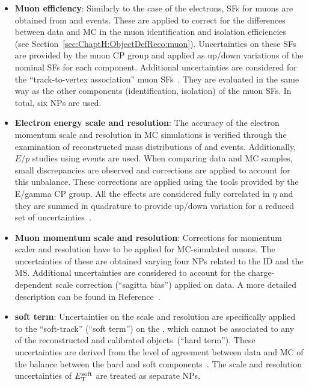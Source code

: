 \begin{itemize}
	\item \textbf{Muon efficiency}: Similarly to the case of the electrons, SFs for muons are obtained from \Zmpmm 
	and \Jmm events. These are applied to correct for the differences between data and MC in the muon identification 
	and isolation efficiencies~\cite{MUON-2018-03} (see Section~\ref{sec:ChaptH:ObjectDefReco:muon}).
	Uncertainties on these SFs are provided by the muon CP group %
	and applied as up/down variations of the nominal SFs for each component.
	Additional uncertainties are considered for the ``track-to-vertex association'' 
	muon SFs~\cite{PERF-2015-10,MUON-2018-03}. They are evaluated in the same way as 
	the other components (identification, isolation) of the muon SFs. In total, six NPs are used.


	\item \textbf{Electron energy scale and resolution}: The accuracy of the electron momentum 
	scale and resolution in MC simulations is verified through the examination of reconstructed 
	mass distributions of \Zepem and \Jee events. Additionally, $E/p$ studies using \Wen events are
	used. 
	When comparing data and MC samples, small discrepancies are observed and corrections 
	are applied to account for this unbalance.  These corrections are applied using the tools
	provided by the E/gamma CP group. All the effects are 
	considered fully correlated in $\eta$ and they are summed in quadrature to provide up/down
	variation for a reduced set of uncertainties~\cite{EGAM-2018-01,PERF-2017-01}.
	
	\item \textbf{Muon momentum scale and resolution}:	 Corrections for momentum scaler and resolution
		have to be applied for MC-simulated muons. The uncertainties of these are obtained varying
		four NPs related to the ID and the MS. 
		Additional uncertainties are considered to account for the charge-dependent scale 
		correction (``sagitta bias'') applied on data. A more detailed description can be found 
		in Reference~\cite{PERF-2015-10,MUON-2018-03}.  
		
	\item \textbf{\MET soft term}: Uncertainties on the scale and resolution are specifically applied 
		to the ``soft-track'' (``soft term'') on the \met, which cannot be associated to any of the 
  		reconstructed and calibrated objects~(``hard term''). These uncertainties are derived 
		from the level of agreement between data and MC of the \pt balance between the 
  		hard and soft \met components~\cite{PERF-2016-07}. The scale and resolution uncertainties 
		of $E_{\text{T}}^{\text{soft}}$ are treated as separate NPs.
	
	
\end{itemize}



